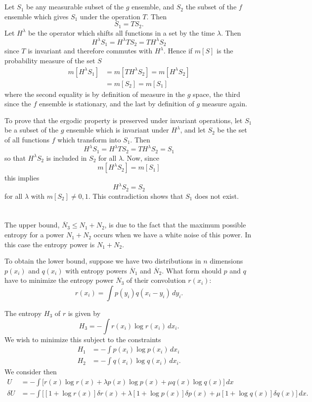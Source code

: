 \appendix
\section{}
\label{ap:5}

Let $S_1$ be any measurable subset of the $g$ ensemble, and $S_2$ the
subset of the $f$ ensemble which gives $S_1$ under the operation $T$.  Then
$$
S_1=TS_2.
$$
Let $H^\lambda$ be the operator which shifts all functions in a set by the
time $\lambda$.  Then
$$
H^\lambda S_1=H^\lambda TS_2=TH^\lambda S_2
$$
since $T$ is invariant and therefore commutes with $H^\lambda$.  Hence if
$m[S]$ is the probability measure of the set $S$
\begin{align*}
m[H^\lambda S_1]&=m[TH^\lambda S_2]=m[H^\lambda S_2]\\
&=m[S_2]=m[S_1]
\end{align*}
where the second equality is by definition of measure in the $g$ space, the
third since the $f$ ensemble is stationary, and the last by definition
of $g$ measure again.

To prove that the ergodic property is preserved under invariant operations,
let $S_1$ be a subset of the $g$ ensemble which is invariant under
$H^\lambda$, and let $S_2$ be the set of all functions $f$ which transform
into $S_1$.  Then
$$
H^\lambda S_1=H^\lambda TS_2=TH^\lambda S_2=S_1
$$
so that $H^\lambda S_2$ is included in $S_2$ for all $\lambda$.  Now,
since
$$
m[H^\lambda S_2]=m[S_1]
$$
this implies
$$
H^\lambda S_2=S_2
$$
for all $\lambda$ with $m[S_2]\neq 0,1$.  This contradiction shows that
$S_1$ does not exist.

\section{}
\label{ap:6}

The upper bound, $\overline N_3\leq N_1+N_2$, is due to the fact that
the maximum possible entropy for a power $N_1+N_2$ occurs when we have
a white noise of this power.  In this case the entropy power is $N_1+N_2$.

To obtain the lower bound, suppose we have two distributions in $n$
dimensions $p(x_i)$ and $q(x_i)$ with entropy powers $\overline N_1$
and $\overline N_2$.  What form should $p$ and $q$ have to minimize the
entropy power $\overline N_3$ of their convolution $r(x_i)$:
$$
r(x_i)=\int p(y_i)q(x_i-y_i)\,dy_i.
$$

The entropy $H_3$ of $r$ is given by
$$
H_3=-\int r(x_i)\log r(x_i)\,dx_i.
$$
We wish to minimize this subject to the constraints
\begin{align*}
H_1&=-\int p(x_i)\log p(x_i)\,dx_i\\
H_2&=-\int q(x_i)\log q(x_i)\,dx_i.
\end{align*}
We consider then
\begin{align*}
U&=-\int\bigl[r(x)\log r(x)+\lambda p(x)\log p(x)
	+\mu q(x)\log q(x)\bigr]\,dx\\
\delta U&=-\int\bigl[[1+\log r(x)]\delta r(x)
	+\lambda[1+\log p(x)]\delta p(x) %
        +\mu[1+\log q(x)]
         \delta q(x)\bigr]\,dx.
\end{align*}

